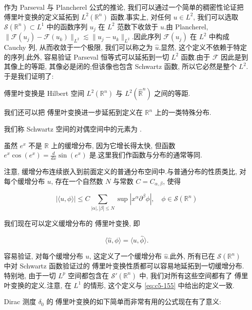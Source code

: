 作为 Parseval 与 Plancherel 公式的推论, 我们可以通过一个简单的稠密性论证把 傅里叶变换的定义延拓到 $L^2(\mathbb{R}^n)$ 函数.事实上, 对任何 $u\in L^2$, 我们可以选取 $\mathcal{S}(\mathbb{R}^n)\subset L^1$ 中的函数序列 $u_j$ 在 $L^2$ 范数下收敛于 $u$.由 Plancherel, $\|\mathcal{F}(u_j)-\mathcal{F}(u_k)\|_{L^2}\lesssim\|u_j-u_k\|_{L^2}$.因此序列 $\mathcal{F}(u_j)$ 在 $L^2$ 中构成 Cauchy 列, 从而收敛于一个极限, 我们可以称之为 $\hat{u}$.显然, 这个定义不依赖于特定的序列.此外, 容易验证 Parseval 恒等式可以延拓到一切 $L^2$ 函数.由于 $\mathcal{F}$ 因此是到其像上的等距, 其像必是闭的;但该像也包含 Schwartz 函数, 所以它必然是整个 $L^2$.于是我们证明了:

\begin{theorem}\label{thm:c5-3.1}
傅里叶变换是 Hilbert 空间 $L^2(\mathbb{R}^n)$ 与 $L^2(\widehat{\mathbb{R}}^n)$ 之间的等距.
\end{theorem}

我们还可以把 傅里叶变换进一步延拓到定义在 $\mathbb{R}^n$ 上的一类特殊分布.

\begin{definition*}
我们称 Schwartz 空间的对偶空间中的元素为 .
\end{definition*}

\begin{example*}
虽然 $e^x$ 不是 $\mathbb{R}$ 上的缓增分布, 因为它增长得太快, 但函数 $e^x\cos(e^x) = \frac{d}{dx}\sin(e^x)$ 是.这里我们作函数与分布的通常等同.
\end{example*}

注意, 缓增分布连续嵌入到前面定义的普通分布空间中.与普通分布的性质类比, 对每个缓增分布 $u$, 存在一个自然数 $N$ 与常数 $C = C_{\alpha, \beta}$, 使得

\[
|\langle u, \phi\rangle| \leq C\sum_{|\alpha|, |\beta|\leq N}\sup|x^\alpha\partial^\beta\phi|, \quad \phi\in\mathcal{S}(\mathbb{R}^n)
\]

我们现在可以定义缓增分布的 傅里叶变换, 即

\[
\langle\hat{u}, \phi\rangle = \langle u, \hat{\phi}\rangle.
\]

容易验证, 对每个缓增分布 $u$, 这定义了一个缓增分布 $\hat{u}$.此外, 所有已在 $\mathcal{S}(\mathbb{R}^n)$ 中对 Schwartz 函数验证过的 傅里叶变换性质都可以容易地延拓到一切缓增分布.特别地, 由于一切 $L^p$ 空间都包含在 $\mathcal{S}'(\mathbb{R}^n)$ 中, 我们对所有这些空间都有了 傅里叶变换的定义.注意, 在 $L^1$ 的情形, 这个定义与 \eqref{eq:c5-155} 中给出的定义一致.

Dirac 测度 $\delta_0$ 的 傅里叶变换的如下简单而非常有用的公式现在有了意义:

